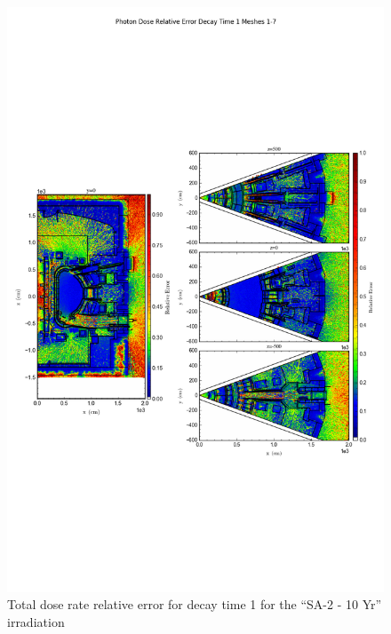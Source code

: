 \documentclass[12pt]{article}
\begin{document}
\begin{figure}[ht!]
\centering
\includegraphics[trim={0cm 8cm, 0cm 8cm},clip,scale=0.75]{../plots/final_model_with_b4c/5year/Photon_Dose_Relative_Error_Decay_Time_1_Meshes_1-7.png}
\caption{Total dose rate relative error for decay time 1 for the ``SA-2 - 10 Yr'' irradiation}
\label{fig:photons_5y_dc1_b4c_relerr}
\end{figure}
\clearpage
\end{document}
